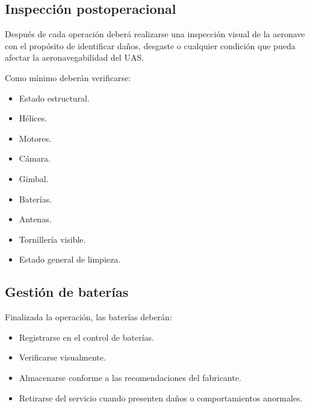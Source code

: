\subsection{Inspección postoperacional}

Después de cada operación deberá realizarse una inspección visual de la aeronave con el propósito de identificar daños, desgaste o cualquier condición que pueda afectar la aeronavegabilidad del UAS.

Como mínimo deberán verificarse:

\begin{itemize}

\item Estado estructural.

\item Hélices.

\item Motores.

\item Cámara.

\item Gimbal.

\item Baterías.

\item Antenas.

\item Tornillería visible.

\item Estado general de limpieza.

\end{itemize}


\subsection{Gestión de baterías}

Finalizada la operación, las baterías deberán:

\begin{itemize}

\item Registrarse en el control de baterías.

\item Verificarse visualmente.

\item Almacenarse conforme a las recomendaciones del fabricante.

\item Retirarse del servicio cuando presenten daños o comportamientos anormales.

\end{itemize}

